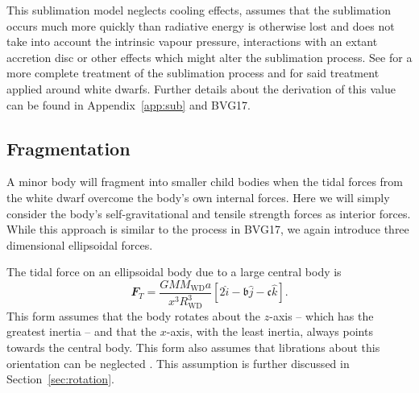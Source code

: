 \documentclass[fleqn,usenatbib]{mnras}
\begin{document}
This sublimation model neglects cooling effects, assumes that the sublimation occurs much more quickly than radiative energy is otherwise lost and does not take into account the intrinsic vapour pressure, interactions with an extant accretion disc or other effects which might alter the sublimation process.
See \cite{Steckloff2015} for a more complete treatment of the sublimation process and \cite{Steckloff2021} for said treatment applied around white dwarfs.
Further details about the derivation of this value can be found in Appendix~\ref{app:sub} and BVG17.

\subsection{Fragmentation} \label{subsec:fragmentation}
A minor body will fragment into smaller child bodies when the tidal forces from the white dwarf overcome the body's own internal forces.
Here we will simply consider the body's self-gravitational and tensile strength forces as interior forces. 
While this approach is similar to the process in BVG17, we again introduce three dimensional ellipsoidal forces.


The tidal force on an ellipsoidal body due to a large central body is
\begin{equation}
    \label{eq:force_tidal}
    \mathcal{\mathbfit{F}}_T = \frac{G M M_\text{WD} a}{x^3 R_\text{WD}^3} \left[ 2 \hat{i} - \mathfrak{b} \hat{j} - \mathfrak{c} \hat{k} \right].
\end{equation}
This form assumes that the body rotates about the $z$-axis -- which has the greatest inertia -- and that the $x$-axis, with the least inertia, always points towards the central body. This form also assumes that librations about this orientation can be neglected \citep{Dobrovolskis2019}. 
This assumption is further discussed in Section~\ref{sec:rotation}.
\end{document}
